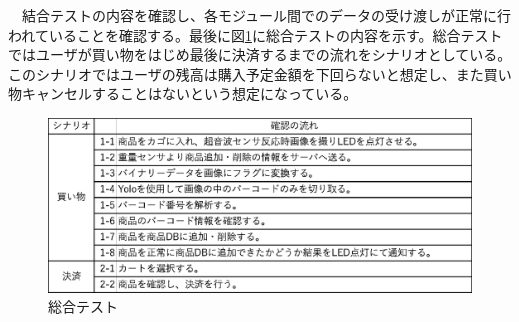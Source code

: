 \newpage

　結合テストの内容を確認し、各モジュール間でのデータの受け渡しが正常に行われていることを確認する。最後に図\ref{integrated_test}に総合テストの内容を示す。総合テストではユーザが買い物をはじめ最後に決済するまでの流れをシナリオとしている。このシナリオではユーザの残高は購入予定金額を下回らないと想定し、また買い物キャンセルすることはないという想定になっている。

\begin{figure}[htbp]
\centering
\includegraphics[width=15cm]{./pic/integrated_test.eps}
\caption{総合テスト}
\label{integrated_test}
\end{figure}

　
